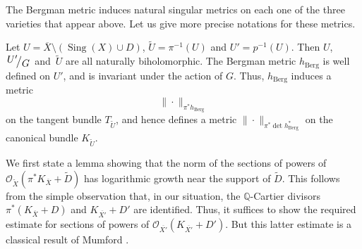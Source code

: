 \documentclass[JEP,XML,SOM,Unicode]{cedram}
\let\mathcal\mathscr
\theoremstyle{plain}
\theoremstyle{definition}
\numberwithin{equation}{theorem}
\DeclareMathOperator{\Sing}{Sing}
\newcommand{\bquotient}[2]{{\left.\raisebox{.2em}{$#1$}\big/\raisebox{-.2em}{$#2$}\right.}}
\newcommand{\norm}[1] { \| #1 \| }
\begin{document}
The Bergman metric induces natural singular metrics on each one of the three varieties that appear above. Let us give more precise notations for these metrics.

Let $U = \overline{X} \setminus \left( \Sing(X) \cup D \right)$, $\widetilde{U} = \pi^{-1}(U)$ and $U' = p^{-1}(U)$. Then $U$, $\bquotient{U'\!}{G}$ and~$\widetilde{U}$ are all naturally biholomorphic. The Bergman metric $h_{\mathrm{Berg}}$ is well defined on $U'$, and is invariant under the action of $G$. Thus, $h_{\mathrm{Berg}}$ induces a metric\vspace*{-1pt}
$$\norm{\cdot}_{\pi^\ast h_{\mathrm{Berg}}}$$
on the tangent bundle $T_{\widetilde{U}}$, and hence defines a metric $\norm{\cdot}_{ \pi^\ast \det h^\ast_{\mathrm{Berg}}}$ on the canonical bundle $K_{\widetilde{U}}$.

We first state a lemma showing that the norm of the sections of powers of $\mathcal O_{\widetilde{X}}( \pi^\ast K_{\overline{X}} + \widetilde{D})$ has logarithmic growth near the support of $\widetilde{D}$. This follows from the simple observation that, in our situation, the $\mathbb Q$-Cartier divisors $\pi^{\ast} \left( K_{\overline{X}} + D \right)$ and $K_{\overline{X'}} + D'$ are identified. Thus, it suffices to show the required estimate for sections of powers of $\mathcal O_{\overline{X'}} (K_{\overline{X'}} + D')$. But this latter estimate is a classical result of Mumford \cite{Mum77}.
\end{document}
